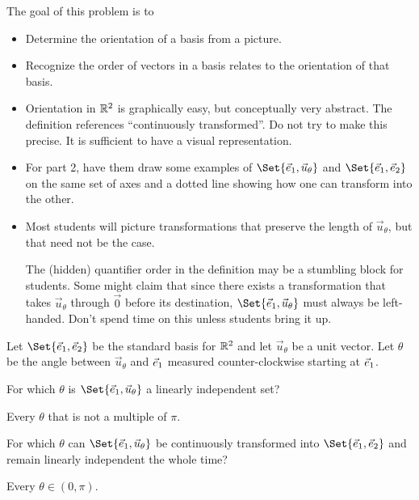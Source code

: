 \documentclass{workbook}
\newcommand{\bookonlynewpage}{\begin{bookonly}\newpage\end{bookonly}}
\begin{document}
\begin{slide}
	\bookonlynewpage

	\question
	\begin{annotation}
		\begin{goals}

			The goal of this problem is to
			\begin{itemize}
				\item Determine the orientation of a basis from a  picture.
				\item Recognize the order of vectors in a basis relates to the
					orientation of that basis.
			\end{itemize}
		\end{goals}

		\begin{notes}
			\begin{itemize}
				\item Orientation in $\mathbb{R}^2$ is graphically easy, but conceptually very abstract.
					The definition references ``continuously transformed''. Do not try
					to make this precise. It is sufficient to have a visual representation.
				\item For part 2, have them draw some examples of $\Set{\xhat, \vec u_\theta}$
					and $\Set{\xhat, \yhat}$ on the same set of axes and a dotted line
					showing how one can transform into the other.
				\item Most students will picture transformations that preserve the length of $\vec u_\theta$,
					but that need not be the case.

					The (hidden) quantifier order in the definition may be a stumbling block for students. Some might
					claim that since there exists a transformation that takes $\vec u_\theta$ through $\vec 0$
					before its destination, $\Set{\xhat,\vec u_\theta}$ must always be left-handed.
					Don't spend time on this unless students bring it up.
			\end{itemize}
		\end{notes}
	\end{annotation}
	Let $\Set{\xhat,\yhat}$ be the standard basis for $\mathbb{R}^2$ and let
	$\vec u_{\theta}$ be a unit vector. Let $\theta$ be the angle between $\vec u_{\theta}$ and
	${\vec e_1}$ measured counter-clockwise starting at ${\vec e_1}$.
	\begin{parts}
		\item For which $\theta$ is $\Set{\xhat,\vec u_{\theta}}$ a linearly independent set?
			\begin{solution}[inline]
				Every $\theta$ that is not a multiple of $\pi$.
			\end{solution}
		\item For which $\theta$ can $\Set{\xhat,\vec u_{\theta}}$ be continuously
			transformed into $\Set{\xhat,\yhat}$ and remain linearly independent the
			whole time?
			\begin{solution}
				Every $\theta \in (0, \pi)$.


\end{solution}
\end{parts}
\end{slide}
\end{document}
